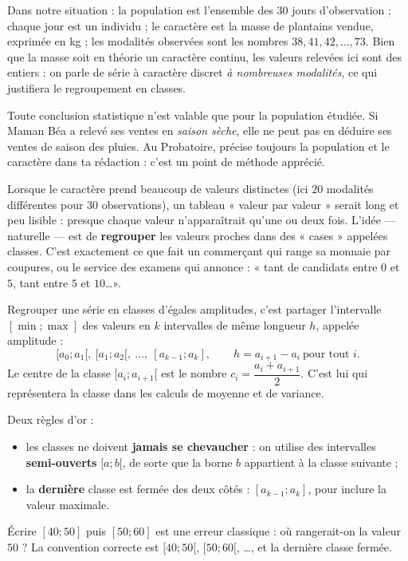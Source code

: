 \documentclass[11pt]{article}
\newcommand{\cle}[1]{{\popxbold\color{popdark}#1}}
\newcounter{popsec}
\newcounter{popsub}
\newcommand{\courssub}[1]{%
  \stepcounter{popsub}%
  \par\vspace{9pt}\noindent{\popxbold\fontsize{11.5}{13}\selectfont\color{popink}{\color{poporange}\thepopsec.\thepopsub}\hspace{6pt}#1}\par\nopagebreak\vspace{4pt}
}
\begin{document}
Dans notre situation : la population est l'ensemble des $30$ jours d'observation ; chaque jour est un individu ; le caractère est la masse de plantains vendue, exprimée en kg ; les modalités observées sont les nombres $38, 41, 42, \ldots, 73$. Bien que la masse soit en théorie un caractère continu, les valeurs relevées ici sont des entiers : on parle de série à caractère discret \emph{à nombreuses modalités}, ce qui justifiera le regroupement en classes.

\begin{attention}
Toute conclusion statistique n'est valable que pour la population étudiée. Si Maman Béa a relevé ses ventes en \emph{saison sèche}, elle ne peut pas en déduire ses ventes de saison des pluies. Au Probatoire, précise toujours la population et le caractère dans ta rédaction : c'est un point de méthode apprécié.
\end{attention}

\courssub{Pourquoi regrouper en classes ?}

Lorsque le caractère prend beaucoup de valeurs distinctes (ici $20$ modalités différentes pour $30$ observations), un tableau « valeur par valeur » serait long et peu lisible : presque chaque valeur n'apparaîtrait qu'une ou deux fois. L'idée — naturelle — est de \textbf{regrouper} les valeurs proches dans des « cases » appelées \cle{classes}. C'est exactement ce que fait un commerçant qui range sa monnaie par coupures, ou le service des examens qui annonce : « tant de candidats entre $0$ et $5$, tant entre $5$ et $10$\ldots ».

\begin{definition}
Regrouper une série en \cle{classes d'égales amplitudes}, c'est partager l'intervalle $[\min ; \max]$ des valeurs en $k$ intervalles de même longueur $h$, appelée \cle{amplitude} :
\[ [a_0 ; a_1[,\ [a_1 ; a_2[,\ \ldots,\ [a_{k-1} ; a_k], \qquad h = a_{i+1} - a_i \ \text{pour tout } i. \]
Le \cle{centre} de la classe $[a_i ; a_{i+1}[$ est le nombre $c_i = \dfrac{a_i + a_{i+1}}{2}$. C'est lui qui représentera la classe dans les calculs de moyenne et de variance.
\end{definition}

\begin{attention}
Deux règles d'or :
\begin{itemize}
\item les classes ne doivent \textbf{jamais se chevaucher} : on utilise des intervalles \textbf{semi-ouverts} $[a ; b[$, de sorte que la borne $b$ appartient à la classe suivante ;
\item la \textbf{dernière} classe est fermée des deux côtés : $[a_{k-1} ; a_k]$, pour inclure la valeur maximale.
\end{itemize}
Écrire $[40;50]$ puis $[50;60]$ est une erreur classique : où rangerait-on la valeur $50$ ? La convention correcte est $[40;50[$, $[50;60[$, \ldots, et la dernière classe fermée.
\end{attention}
\end{document}
